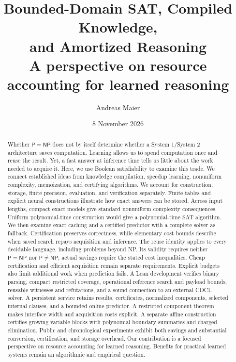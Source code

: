\documentclass[11pt,a4paper]{article}
\title{\vspace{-1.0cm}\textbf{Bounded-Domain SAT, Compiled Knowledge,\\and Amortized Reasoning}\\[0.5em]
\large A perspective on resource accounting for learned reasoning}
\author{Andreas Maier}
\date{8 November 2026}
\numberwithin{equation}{section}
\newcommand{\Pclass}{\mathsf{P}}
\newcommand{\NPclass}{\mathsf{NP}}
\theoremstyle{plain}
\theoremstyle{definition}
\theoremstyle{remark}
\begin{document}
\maketitle
\vspace{-0.7cm}

\begin{abstract}
Whether $\Pclass=\NPclass$ does not by itself determine whether a System 1/System 2 architecture saves computation. Learning allows us to spend computation once and reuse the result. Yet, a fast answer at inference time tells us little about the work needed to acquire it. Here, we use Boolean satisfiability to examine this trade. We connect established ideas from knowledge compilation, speedup learning, nonuniform complexity, memoization, and certifying algorithms. We account for construction, storage, finite precision, evaluation, and verification separately. Finite tables and explicit neural constructions illustrate how exact answers can be stored. Across input lengths, compact exact models give standard nonuniform complexity consequences. Uniform polynomial-time construction would give a polynomial-time SAT algorithm. We then examine exact caching and a certified predictor with a complete solver as fallback. Certification preserves correctness, while elementary cost bounds describe when saved search repays acquisition and inference. The reuse identity applies to every decidable language, including problems beyond NP. Its validity requires neither $\Pclass=\NPclass$ nor $\Pclass\neq\NPclass$; actual savings require the stated cost inequalities. Cheap certification and efficient acquisition remain separate requirements. Explicit budgets also limit additional work when prediction fails. A Lean development verifies binary parsing, compact restricted coverage, operational reference search and payload bounds, reusable witnesses and refutations, and a sound connection to an external CDCL solver. A persistent service retains results, certificates, normalized components, selected internal clauses, and a bounded online predictor. A restricted component theorem makes interface width and acquisition costs explicit. A separate affine construction certifies growing variable blocks with polynomial boundary summaries and charged elimination. Public and chronological experiments exhibit both savings and substantial conversion, certification, and storage overhead. Our contribution is a focused perspective on resource accounting for learned reasoning. Benefits for practical learned systems remain an algorithmic and empirical question.
\end{abstract}
\end{document}
